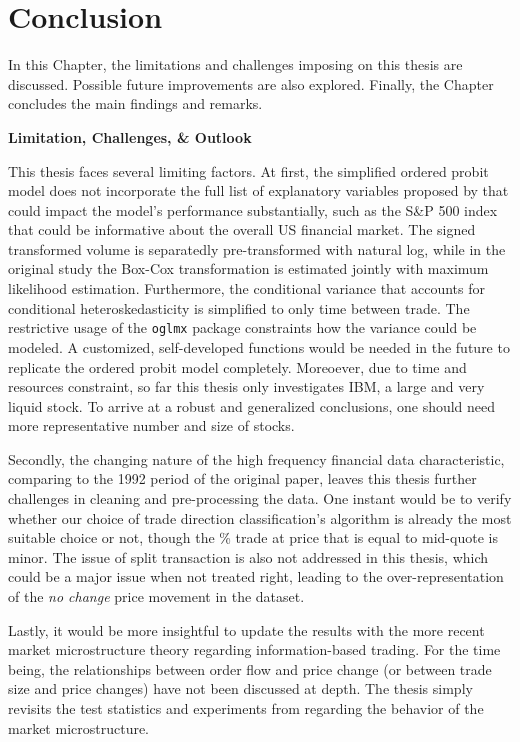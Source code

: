 \chapter{Conclusion}\label{chap:conclusion}
In this Chapter, the limitations and challenges imposing on this thesis are discussed. Possible future improvements are also explored. Finally, the Chapter concludes the main findings and remarks. 

\vspace{5mm}
{\noindent\bfseries Limitation, Challenges, \& Outlook }

This thesis faces several limiting factors. At first, the simplified ordered probit model does not incorporate the full list of explanatory variables proposed by \citet{hausman1992} that could impact the model's performance substantially, such as the S\&P 500 index that could be informative about the overall US financial market. The signed transformed volume is separatedly pre-transformed with natural log, while in the original study the Box-Cox transformation is estimated jointly with maximum likelihood estimation. Furthermore, the conditional variance that accounts for conditional heteroskedasticity is simplified to only time between trade. The restrictive usage of the \verb|oglmx| package constraints how the variance could be modeled. A customized, self-developed functions would be needed in the future to replicate the ordered probit model completely. Moreoever, due to time and resources constraint, so far this thesis only investigates IBM, a large and very liquid stock. To arrive at a robust and generalized conclusions, one should need more representative number and size of stocks. 

Secondly, the changing nature of the high frequency financial data characteristic, comparing to the 1992 period of the original paper, leaves this thesis further challenges in cleaning and pre-processing the data. One instant would be to verify whether our choice of trade direction classification's algorithm is already the most suitable choice or not, though the \% trade at price that is equal to mid-quote is minor. The issue of split transaction \citep{hautsch2012} is also not addressed in this thesis, which could be a major issue when not treated right, leading to the over-representation of the \textit{no change} price movement in the dataset.

Lastly, it would be more insightful to update the results with the more recent market microstructure theory regarding information-based trading. For the time being, the relationships between order flow and price change (or between trade size and price changes) have not been discussed at depth. The thesis simply revisits the test statistics and experiments from \citet{hausman1992} regarding the behavior of the market microstructure.




